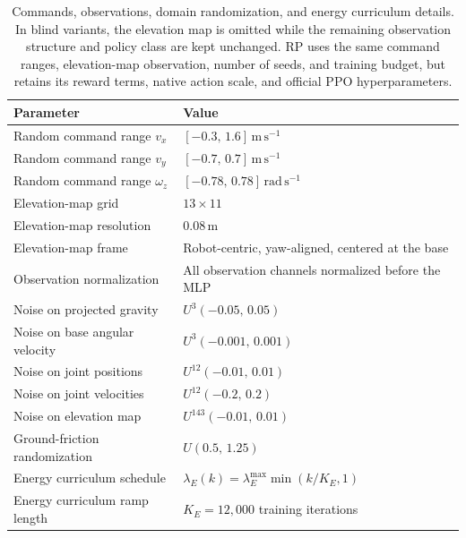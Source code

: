 \documentclass{article}
\newcommand{\baselineFive}{RP}
\begin{document}
    \begin{table}[htbp]
        \centering
        \small
        \caption{Commands, observations, domain randomization, and energy curriculum details. In blind variants, the elevation map is omitted while the remaining observation structure and policy class are kept unchanged. \baselineFive{} uses the same command ranges, elevation-map observation, number of seeds, and training budget, but retains its reward terms, native action scale, and official PPO hyperparameters.}
        \label{tab:appendix-observation-dr-details}
        \begin{tabular}{ll}
            \toprule
            \textbf{Parameter} & \textbf{Value} \\
            \midrule
            Random command range \(v_x\) & \([-0.3,\,1.6]\,\mathrm{m\,s^{-1}}\) \\
            Random command range \(v_y\) & \([-0.7,\,0.7]\,\mathrm{m\,s^{-1}}\) \\
            Random command range \(\omega_z\) & \([-0.78,\,0.78]\,\mathrm{rad\,s^{-1}}\) \\
            Elevation-map grid & \(13\times 11\) \\
            Elevation-map resolution & \(0.08\,\mathrm{m}\) \\
            Elevation-map frame & Robot-centric, yaw-aligned, centered at the base \\
            Observation normalization & All observation channels normalized before the MLP \\
            Noise on projected gravity & \(U^3(-0.05,\,0.05)\) \\
            Noise on base angular velocity & \(U^3(-0.001,\,0.001)\) \\
            Noise on joint positions & \(U^{12}(-0.01,\,0.01)\) \\
            Noise on joint velocities & \(U^{12}(-0.2,\,0.2)\) \\
            Noise on elevation map & \(U^{143}(-0.01,\,0.01)\) \\
            Ground-friction randomization & \(U(0.5,\,1.25)\) \\
            Energy curriculum schedule & \(\lambda_E(k)=\lambda_E^{\max}\min(k/K_E,1)\) \\
            Energy curriculum ramp length & \(K_E = 12{,}000\) training iterations \\
            \bottomrule
        \end{tabular}
    \end{table}
    
\end{document}
